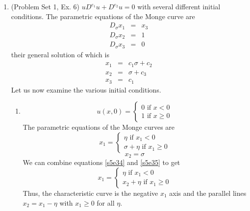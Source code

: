 \documentclass{article}
\theoremstyle{plain}
\numberwithin{thm}{section}
\theoremstyle{plain}
\numberwithin{prop}{section}
\theoremstyle{definition}
\numberwithin{defn}{section}
\theoremstyle{remark}
\numberwithin{equation}{section}
\begin{document}
\begin{enumerate}
\item (Problem Set 1, Ex. 6) $uD^{e_1}u + D^{e_2}u = 0$ with several different initial conditions.
The parametric equations of the Monge curve are
\begin{eqnarray}
D_\sigma x_1 &=& x_3 \label{s5e27} \\
D_\sigma x_2 &=& 1 \label{s5e28} \\
D_\sigma x_3 &=& 0 \label{s5e29}
\end{eqnarray}
their general solution of which is
\begin{eqnarray}
x_1 &=& c_1\sigma + c_2 \label{s5e30} \\
x_2 &=& \sigma + c_3 \label{s5e31} \\
x_3 &=& c_1 \label{s5e32}
\end{eqnarray}
Let us now examine the various initial conditions.
\begin{enumerate}
\item \begin{equation}\label{s5e33}
u(x, 0) = \begin{cases}
0 \text{ if } x < 0 \\
1 \text{ if } x \ge 0
\end{cases}
\end{equation}
The parametric equations of the Monge curves are
\begin{equation}\label{s5e34}
x_1 = \begin{cases}
\eta \text{ if } x_1 < 0 \\
\sigma + \eta \text{ if } x_1 \ge 0
\end{cases}
\end{equation}
\begin{equation}\label{s5e35}
x_2 = \sigma
\end{equation}
We can combine equations \eqref{s5e34} and \eqref{s5e35} to get
\begin{equation}\label{s5e36}
x_1 = \begin{cases}
\eta \text{ if } x_1 < 0 \\
x_2 + \eta \text{ if } x_1 \ge 0
\end{cases}
\end{equation}
Thus, the characteristic curve is the negative $x_1$ axis and the parallel lines $x_2 = x_1 - \eta$
with $x_1 \ge 0$ for all $\eta$.


\end{enumerate}
\end{enumerate}
\end{document}
